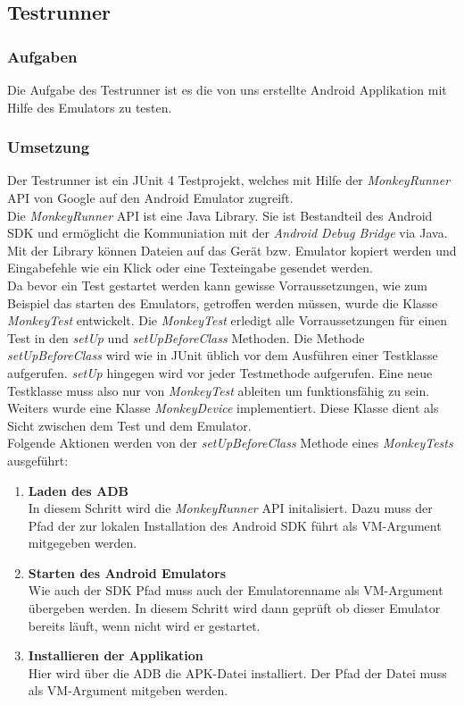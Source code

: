 
\subsection{Testrunner}

\subsubsection{Aufgaben}
Die Aufgabe des Testrunner ist es die von uns erstellte Android Applikation mit Hilfe des Emulators zu testen.

\subsubsection{Umsetzung}
Der Testrunner ist ein JUnit 4 Testprojekt, welches mit Hilfe der \textit{MonkeyRunner} API von Google auf den Android Emulator zugreift. \\
Die \textit{MonkeyRunner} API ist eine Java Library. Sie ist Bestandteil des Android SDK und ermöglicht die Kommuniation mit der \textit{Android Debug Bridge} via Java. Mit der Library können Dateien auf das Gerät bzw. Emulator  kopiert werden und Eingabefehle wie ein Klick oder eine Texteingabe gesendet werden. \\[0.5em]
Da bevor ein Test gestartet werden kann gewisse Vorraussetzungen, wie zum Beispiel das starten des Emulators, getroffen werden müssen, wurde die Klasse \textit{MonkeyTest} entwickelt. Die \textit{MonkeyTest} erledigt alle Vorraussetzungen für einen Test in den \textit{setUp} und \textit{setUpBeforeClass} Methoden. Die Methode \textit{setUpBeforeClass} wird wie in JUnit üblich vor dem Ausführen einer Testklasse aufgerufen. \textit{setUp} hingegen wird vor jeder Testmethode aufgerufen. Eine neue Testklasse muss also nur von \textit{MonkeyTest} ableiten um funktionsfähig zu sein. \\
Weiters wurde eine Klasse \textit{MonkeyDevice} implementiert. Diese Klasse dient als Sicht zwischen dem Test und dem Emulator. \\
Folgende Aktionen werden von der \textit{setUpBeforeClass} Methode eines \textit{MonkeyTests} ausgeführt:
\begin{enumerate}
\item{\textbf{Laden des ADB}} \\
In diesem Schritt wird die \textit{MonkeyRunner} API initalisiert. Dazu muss der Pfad der zur lokalen Installation des Android SDK führt als VM-Argument mitgegeben werden.
\item{\textbf{Starten des Android Emulators}} \\
Wie auch der SDK Pfad muss auch der Emulatorenname als VM-Argument übergeben werden. In diesem Schritt wird dann geprüft ob dieser Emulator bereits läuft, wenn nicht wird er gestartet.
\item{\textbf{Installieren der Applikation}} \\
Hier wird über die ADB die APK-Datei installiert. Der Pfad der Datei muss als VM-Argument mitgeben werden.
\end{enumerate}
